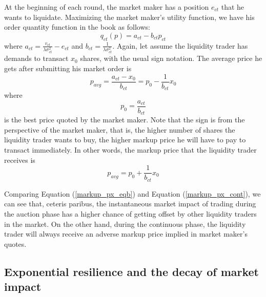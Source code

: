 \documentclass{article}
\begin{document}
At the beginning of each round, the market maker has a position $e_{ct}$ that he wants to liquidate. Maximizing the market maker's utility function, we have his order quantity function in the book as follows:
\[
  q_{ct}(p) = a_{ct} - b_{ct} p_{ct}
\]
where $a_{ct} = \frac{v_{ct}}{\lambda \sigma_{ct}^2} - e_{ct}$ and $b_{ct}=\frac{1}{\lambda \sigma_{ct}^2}$. Again, let assume the liquidity trader has demands to transact $x_0$ shares, with the usual sign notation. The average price he gets after submitting his market order is
\[
  p_{avg} = \frac{a_{ct}-x_0}{b_{ct}}=p_0 - \frac{1}{b_{ct}} x_0
\]
where
\[
  p_0 = \frac{a_{ct}}{b_{ct}}
\]
is the best price quoted by the market maker. Note that the sign is from the perspective of the market maker, that is, the higher number of shares the liquidity trader wants to buy, the higher markup price he will have to pay to transact immediately. In other words, the markup price that the liquidity trader receives is
\begin{equation}\label{markup_px_cont}
  p_{avg} = p_0 + \frac{1}{b_{ct}} x_0
\end{equation}

Comparing Equation (\ref{markup_px_eqb}) and Equation (\ref{markup_px_cont}), we can see that, ceteris paribus, the instantaneous market impact of trading during the auction phase has a higher chance of getting offset by other liquidity traders in the market. On the other hand, during the continuous phase, the liquidity trader will always receive an adverse markup price implied in market maker's quotes.

\subsection{Exponential resilience and the decay of market impact}
\end{document}

